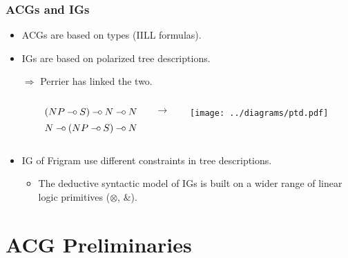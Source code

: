 \documentclass{beamer}
\def\limp {\mathbin{{-}\mkern-3.5mu{\circ}}}
\begin{document}
\begin{frame}
  \frametitle{ACGs and IGs}

  \begin{itemize}
  \item ACGs are based on types (IILL formulas).
  \item IGs are based on polarized tree descriptions.
    \vfill
  \item[$\Rightarrow$] Perrier has linked the two.

    \vspace{2 mm}
    \begin{columns}[c]
      \begin{column}{0.1\textwidth}\end{column}
      \begin{column}{0.4\textwidth}
        $$(NP \limp S) \limp N \limp N$$
        $$N \limp (NP \limp S) \limp N$$
      \end{column}
      \begin{column}{0.1\textwidth}$\to$\end{column}
      \begin{column}{0.2\textwidth}
        \texttt{[image: ../diagrams/ptd.pdf]}
      \end{column}
      \begin{column}{0.25\textwidth}\end{column}
    \end{columns}
    \vfill
  \item IG of Frigram use different constraints in tree descriptions.
    \begin{itemize}
    \item The deductive syntactic model of IGs is built on a wider range
      of linear logic primitives ($\otimes$, $\&$).
    \end{itemize}
  \end{itemize}
\end{frame}


\section{ACG Preliminaries}

\newcommand{\synt}[1]{C_{\textrm{#1}}}
\end{document}
